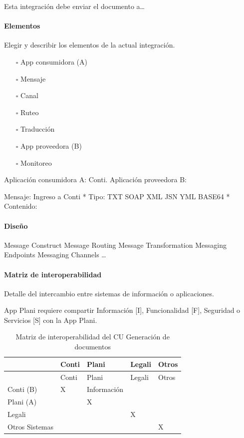 \documentclass[
  paper=a4,
  ,captions=tableheading
]{scrartcl}
\providecommand{\tightlist}{%
  \setlength{\itemsep}{0pt}\setlength{\parskip}{0pt}}
\begin{document}
Esta integración debe enviar el documento a\ldots{}

\paragraph{Elementos}\label{sec:elementos-3}

Elegir y describir los elementos de la actual integración.

\begin{itemize}
\tightlist
\item[$\square$]
  App consumidora (A)
\item[$\square$]
  Mensaje
\item[$\square$]
  Canal
\item[$\square$]
  Ruteo
\item[$\square$]
  Traducción
\item[$\square$]
  App proveedora (B)
\item[$\square$]
  Monitoreo
\end{itemize}

Aplicación consumidora A: Conti. Aplicación proveedora B:

Mensaje: Ingreso a Conti * Tipo: TXT \textbar{} SOAP \textbar{} XML
\textbar{} JSN \textbar{} YML \textbar{} BASE64 * Contenido:

\paragraph{Diseño}\label{sec:diseuxf1o-3}

Message Construct \textbar{} Message Routing \textbar{} Message
Transformation \textbar{} Messaging Endpoints \textbar{} Messaging
Channels \textbar{} \ldots{}

\paragraph{Matriz de
interoperabilidad}\label{sec:matriz-de-interoperabilidad-3}

Detalle del intercambio entre sistemas de información o aplicaciones.

App Plani requiere compartir Información {[}I{]}, Funcionalidad {[}F{]},
Seguridad o Servicios {[}S{]} con la App Plani.

\begin{longtable}[]{@{}lllll@{}}
\caption{Matriz de interoperabilidad del CU Generación de
documentos}\tabularnewline
\toprule\noalign{}
& Conti & Plani & Legali & Otros \\
\midrule\noalign{}
\endfirsthead
\toprule\noalign{}
& Conti & Plani & Legali & Otros \\
\midrule\noalign{}
\endhead
\bottomrule\noalign{}
\endlastfoot
Conti (B) & X & Información & & \\
Plani (A) & & X & & \\
Legali & & & X & \\
Otros Sistemas & & & & X \\
\end{longtable}
\end{document}
